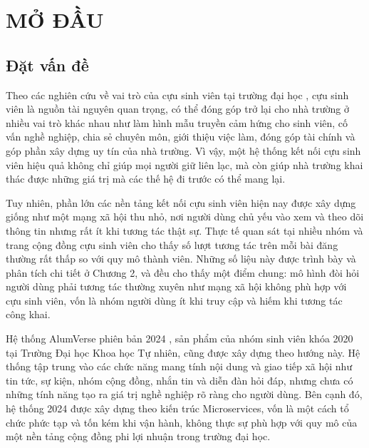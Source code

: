 \documentclass[12pt,a4paper,oneside]{report}
\begin{document}
\newpage
{}
\setcounter{page}{1}

\chapter{MỞ ĐẦU}

\section{Đặt vấn đề}

Theo các nghiên cứu về vai trò của cựu sinh viên tại trường đại học \cite{obeng,unisel}, cựu sinh viên là nguồn tài nguyên quan trọng, có thể đóng góp trở lại cho nhà trường ở nhiều vai trò khác nhau như làm hình mẫu truyền cảm hứng cho sinh viên, cố vấn nghề nghiệp, chia sẻ chuyên môn, giới thiệu việc làm, đóng góp tài chính và góp phần xây dựng uy tín của nhà trường. Vì vậy, một hệ thống kết nối cựu sinh viên hiệu quả không chỉ giúp mọi người giữ liên lạc, mà còn giúp nhà trường khai thác được những giá trị mà các thế hệ đi trước có thể mang lại.

Tuy nhiên, phần lớn các nền tảng kết nối cựu sinh viên hiện nay được xây dựng giống như một mạng xã hội thu nhỏ, nơi người dùng chủ yếu vào xem và theo dõi thông tin nhưng rất ít khi tương tác thật sự. Thực tế quan sát tại nhiều nhóm và trang cộng đồng cựu sinh viên cho thấy số lượt tương tác trên mỗi bài đăng thường rất thấp so với quy mô thành viên. Những số liệu này được trình bày và phân tích chi tiết ở Chương 2, và đều cho thấy một điểm chung: mô hình đòi hỏi người dùng phải tương tác thường xuyên như mạng xã hội không phù hợp với cựu sinh viên, vốn là nhóm người dùng ít khi truy cập và hiếm khi tương tác công khai.

Hệ thống AlumVerse phiên bản 2024 \cite{alumverse}, sản phẩm của nhóm sinh viên khóa 2020 tại Trường Đại học Khoa học Tự nhiên, cũng được xây dựng theo hướng này. Hệ thống tập trung vào các chức năng mang tính nội dung và giao tiếp xã hội như tin tức, sự kiện, nhóm cộng đồng, nhắn tin và diễn đàn hỏi đáp, nhưng chưa có những tính năng tạo ra giá trị nghề nghiệp rõ ràng cho người dùng. Bên cạnh đó, hệ thống 2024 được xây dựng theo kiến trúc Microservices, vốn là một cách tổ chức phức tạp và tốn kém khi vận hành, không thực sự phù hợp với quy mô của một nền tảng cộng đồng phi lợi nhuận trong trường đại học.
\end{document}
